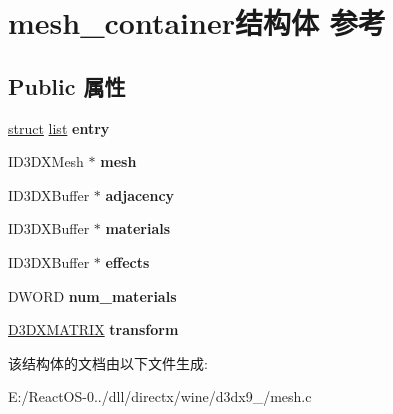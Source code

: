 \hypertarget{structmesh__container}{}\section{mesh\+\_\+container结构体 参考}
\label{structmesh__container}
\subsection*{Public 属性}
\begin{DoxyCompactItemize}
\item 
\mbox{\label{structmesh__container_a4a019da8a88c1fb9a95377b7ac2fc054}} 
\hyperlink{interfacestruct}{struct} \hyperlink{classlist}{list} {\bfseries entry}
\item 
\mbox{\label{structmesh__container_a06b5a1314ff77912a766b6563269a61b}} 
I\+D3\+D\+X\+Mesh $\ast$ {\bfseries mesh}
\item 
\mbox{\label{structmesh__container_a9a79d5c931f4178d71585815c0879591}} 
I\+D3\+D\+X\+Buffer $\ast$ {\bfseries adjacency}
\item 
\mbox{\label{structmesh__container_a049a334a491b0b802fd29faf72391119}} 
I\+D3\+D\+X\+Buffer $\ast$ {\bfseries materials}
\item 
\mbox{\label{structmesh__container_a9aa0fef7f48bd968bd99eaacc107f398}} 
I\+D3\+D\+X\+Buffer $\ast$ {\bfseries effects}
\item 
\mbox{\label{structmesh__container_ace19f2c8aaf6a70a2242e5def8b1f9f3}} 
D\+W\+O\+RD {\bfseries num\+\_\+materials}
\item 
\mbox{\label{structmesh__container_ab62ee91318b594479b2d232b7eb2fd31}} 
\hyperlink{struct___d3_d_m_a_t_r_i_x}{D3\+D\+X\+M\+A\+T\+R\+IX} {\bfseries transform}
\end{DoxyCompactItemize}


该结构体的文档由以下文件生成\+:\begin{DoxyCompactItemize}
\item 
E\+:/\+React\+O\+S-\/0../dll/directx/wine/d3dx9\+\_/mesh.\+c\end{DoxyCompactItemize}
